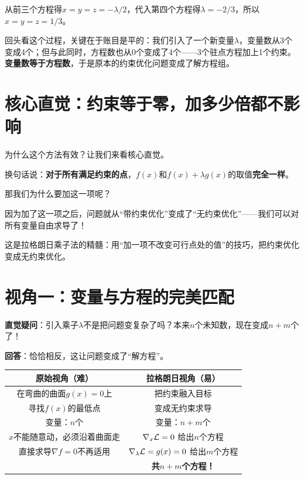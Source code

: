 从前三个方程得$x = y = z = -\lambda/2$，代入第四个方程得$\lambda = -2/3$，所以$x = y = z = 1/3$。

回头看这个过程，关键在于账目是平的：我们引入了一个新变量$\lambda$，变量数从3个变成4个；但与此同时，方程数也从0个变成了4个——3个驻点方程加上1个约束。\textbf{变量数等于方程数}，于是原本的约束优化问题变成了解方程组。

\section{核心直觉：约束等于零，加多少倍都不影响}

为什么这个方法有效？让我们来看核心直觉。

\begin{center}
\end{center}

换句话说：\textbf{对于所有满足约束的点}，$f(x)$和$f(x) + \lambda g(x)$的取值\textbf{完全一样}。

那我们为什么要加这一项呢？

因为加了这一项之后，问题就从“带约束优化”变成了“无约束优化”——我们可以对所有变量自由求导了！

\begin{insightbox}
这是拉格朗日乘子法的精髓：用“加一项不改变可行点处的值”的技巧，把约束优化变成无约束优化。
\end{insightbox}

\section{视角一：变量与方程的完美匹配}

\textbf{直觉疑问}：引入乘子$\lambda$不是把问题变复杂了吗？本来$n$个未知数，现在变成$n+m$个了！

\textbf{回答}：恰恰相反，这让问题变成了“解方程”。

\begin{center}
\begin{tabular}{c|c}
\toprule
\textbf{原始视角（难）} & \textbf{拉格朗日视角（易）} \\
\midrule
在弯曲的曲面$g(x)=0$上 & 把约束融入目标 \\
寻找$f(x)$的最低点 & 变成无约束求导 \\
\midrule
变量：$n$个 & 变量：$n + m$个 \\
$x$不能随意动，必须沿着曲面走 & $\nabla_x \mathcal{L} = 0$ 给出$n$个方程 \\
直接求导$\nabla f=0$不再适用 & $\nabla_\lambda \mathcal{L} = g(x) = 0$ 给出$m$个方程 \\
& \textbf{共$n+m$个方程！}\\
\bottomrule
\end{tabular}
\end{center}

